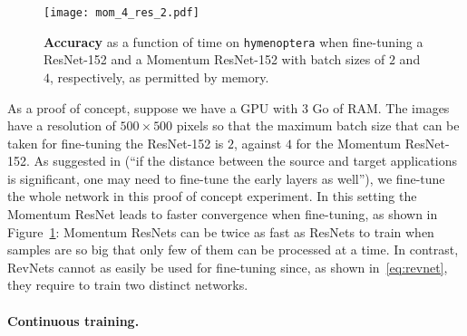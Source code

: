 \documentclass{article}
\begin{document}
\begin{figure}[H]
\begin{minipage}[c]{0.55\linewidth}
        \texttt{[image: mom\_4\_res\_2.pdf]}
    \end{minipage}\hfill
    \begin{minipage}[c]{0.42\linewidth}
        \vspace{-1em}
    \caption{\textbf{Accuracy} as a function of time on \texttt{hymenoptera} when fine-tuning a ResNet-152 and a Momentum ResNet-152 with batch sizes of $2$ and $4$, respectively, as permitted by memory. }\label{fig:fine_tuning}
    \end{minipage}
\end{figure}
\vspace{-1em}
As a proof of concept, suppose we have a GPU with $3$ Go of RAM. The images have a resolution of $500 \times  500$ pixels so that the maximum batch size that can be taken for fine-tuning the ResNet-152 is $2$, against $4$ for the Momentum ResNet-152.  As suggested in \citet{tajbakhsh2016convolutional} (“if the distance between the source and target applications is significant, one may need to fine-tune the early layers as well”), we fine-tune the whole network in this proof of concept experiment.  In this setting the Momentum ResNet leads to faster convergence when fine-tuning, as shown in Figure~\ref{fig:fine_tuning}: Momentum ResNets can be twice as fast as ResNets to train when samples are so big that only few of them can be processed at a time.  In contrast, RevNets \citep{gomez2017reversible} cannot as easily be used for fine-tuning since, as shown in~\eqref{eq:revnet}, they require to train two distinct networks.

\paragraph{Continuous training.} 
\end{document}
